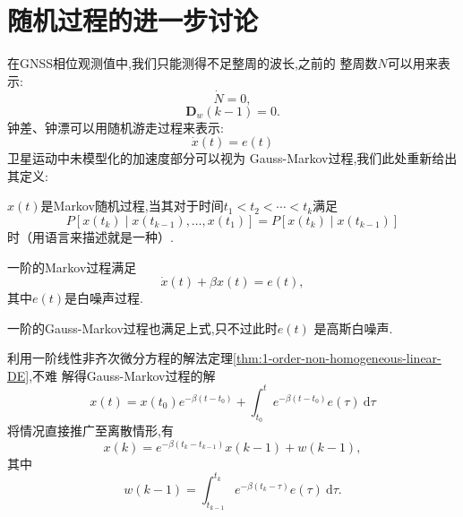 \documentclass[cn,10pt,citestyle=gb7714-2015,bibstyle=gb7714-2015]{elegantbook}
\newcommand{\md}{\ \mathrm{d}}
\begin{document}
\section{随机过程的进一步讨论}\label{sec:controllability-and-measurability}
在GNSS相位观测值中,我们只能测得不足整周的波长,之前的
整周数$N$可以用来表示:
\[
    \dot{N}=0,
\]
\[
    \bm{D}_w(k-1)=0.
\]
钟差、钟漂可以用随机游走过程来表示:
\[
    \dot{x}(t)=e(t)
\]
卫星运动中未模型化的加速度部分可以视为
Gauss-Markov过程,我们此处重新给出其定义:
\begin{definition}\label{def:Gauss-Markov-process2}
  $x(t)$是\textup{Markov}随机过程,当其对于时间$t_1<t_2<\cdots<t_k$满足
  \begin{equation}
    P\left[x(t_k)\mid x(t_{k-1}),\ldots,x(t_1)\right]=P\left[x(t_k)\mid x(t_{k-1})\right]
  \end{equation}
  时（用语言来描述就是一种）.

  一阶的\textup{Markov}过程满足
  \begin{equation}
    \dot{x}(t)+\beta x(t)=e(t),
  \end{equation}
  其中$e(t)$是白噪声过程.

  一阶的\textup{Gauss-Markov}过程也满足上式,只不过此时$e(t)$
  是高斯白噪声.
\end{definition}
利用一阶线性非齐次微分方程的解法定理\ref{thm:1-order-non-homogeneous-linear-DE},不难
解得Gauss-Markov过程的解
\begin{equation}
  x(t)=x(t_0)e^{-\beta(t-t_0)}+\int_{t_0}^te^{-\beta(t-t_0)}e(\tau)\md\tau
\end{equation}
将情况直接推广至离散情形,有
\begin{equation}
  x(k)=e^{-\beta(t_k-t_{k-1})}x(k-1)+w(k-1),
\end{equation}
其中
\begin{equation}
  w(k-1)=\int_{t_{k-1}}^{t_k}e^{-\beta(t_k-\tau)}e(\tau)\md\tau.
\end{equation}
\end{document}
